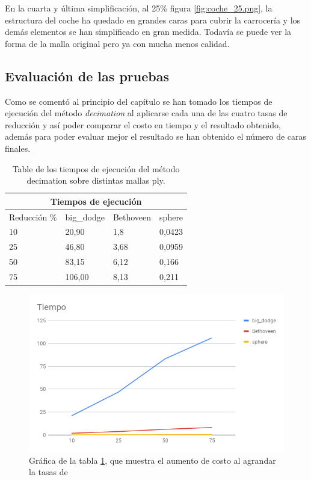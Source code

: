En la cuarta y última simplificación, al 25\% figura \ref{fig:coche_25.png}, la estructura del coche ha quedado en grandes caras para cubrir la carrocería y los demás elementos se han simplificado en gran medida. Todavía se puede ver la forma de la malla original pero ya con mucha menos calidad.

\newpage
\subsection{Evaluación de las pruebas}
Como se comentó al principio del capítulo se han tomado los tiempos de ejecución del método \textit{decimation} al aplicarse cada una de las cuatro tasas de reducción y así poder comparar el costo en tiempo y el resultado obtenido, además para poder evaluar mejor el resultado se han obtenido el número de caras finales.\\

\begin{table}[]
	\centering
	\begin{tabular}{|l|l|l|l|}
		\hline
		\multicolumn{4}{|c|}{Tiempos de ejecución}     \\ \hline
		Reducción \% & big\_dodge & Bethoveen & sphere \\ \hline
		10           & 20,90      & 1,8       & 0,0423 \\ \hline
		25           & 46,80      & 3,68      & 0,0959 \\ \hline
		50           & 83,15      & 6,12      & 0,166  \\ \hline
		75           & 106,00     & 8,13      & 0,211  \\ \hline
	\end{tabular}
	\caption{Table de los tiempos de ejecución del método decimation sobre distintas mallas ply.}
	\label{tab:tiempos_decimation}
\end{table}

\begin{figure} %
	\centering
	\includegraphics[scale=0.5]{imagenes/Tiempo.png} 
	\caption{Gráfica de la tabla \ref{tab:tiempos_decimation}, que muestra el aumento de costo al agrandar la tasas de } \label{fig:tiempo.png}
\end{figure}

